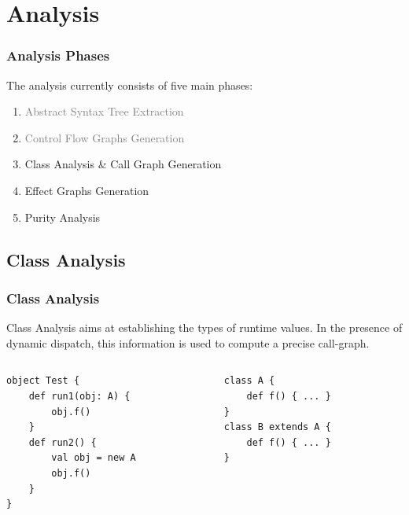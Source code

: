 \documentclass[hyperref={pdfpagelabels=false}]{beamer}
\begin{document}
\section{Analysis}
\begin{frame}
    \frametitle{Analysis Phases}
    The analysis currently consists of five main phases:
    \begin{enumerate}
        \item \textcolor{gray}{Abstract Syntax Tree Extraction}
        \item \textcolor{gray}{Control Flow Graphs Generation}
        \item Class Analysis \& Call Graph Generation
        \item Effect Graphs Generation
        \item Purity Analysis
    \end{enumerate}
\end{frame}

\subsection{Class Analysis}
\begin{frame}[fragile]
\frametitle{Class Analysis}

    Class Analysis aims at establishing the types of runtime values. In
    the presence of dynamic dispatch, this information is used to compute a
    precise call-graph.

    \begin{columns}
      \begin{column}{0.5\textwidth}
\begin{lstlisting}
object Test {
    def run1(obj: A) {
        obj.f()
    }
    def run2() {
        val obj = new A
        obj.f()
    }
}
\end{lstlisting}
      \end{column}
      \begin{column}{0.5\textwidth}
\begin{lstlisting}
class A {
    def f() { ... }
}
class B extends A {
    def f() { ... }
}
\end{lstlisting}
      \end{column}
    \end{columns}


\end{frame}
\end{document}
